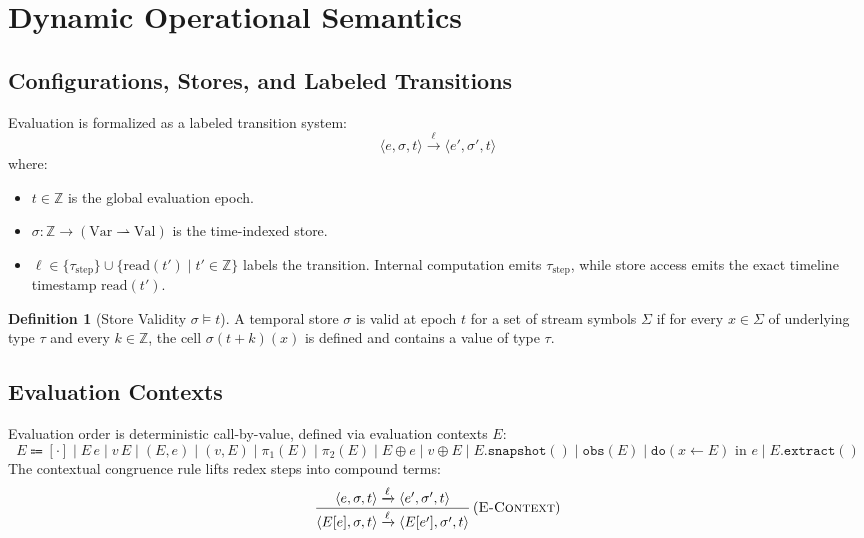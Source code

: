 \documentclass[11pt,a4paper]{article}
\theoremstyle{definition}
\newtheorem{definition}{Definition}[section]
\theoremstyle{plain}
\newcommand{\ty}[1]{\texttt{#1}}
\newcommand{\step}[1]{\xrightarrow{#1}}
\begin{document}
\section{Dynamic Operational Semantics}

\subsection{Configurations, Stores, and Labeled Transitions}

Evaluation is formalized as a labeled transition system:
\[
\langle e, \sigma, t \rangle \step{\ell} \langle e', \sigma', t \rangle
\]
where:
\begin{itemize}[itemsep=1pt]
  \item $t \in \mathbb{Z}$ is the global evaluation epoch.
  \item $\sigma : \mathbb{Z} \to (\text{Var} \rightharpoonup \text{Val})$ is the time-indexed store.
  \item $\ell \in \{\tau_{\text{step}}\} \cup \{\text{read}(t') \mid t' \in \mathbb{Z}\}$ labels the transition. Internal computation emits $\tau_{\text{step}}$, while store access emits the exact timeline timestamp $\text{read}(t')$.
\end{itemize}

\begin{definition}[Store Validity $\sigma \models t$]
A temporal store $\sigma$ is valid at epoch $t$ for a set of stream symbols $\Sigma$ if for every $x \in \Sigma$ of underlying type $\tau$ and every $k \in \mathbb{Z}$, the cell $\sigma(t+k)(x)$ is defined and contains a value of type $\tau$.
\end{definition}

\subsection{Evaluation Contexts}

Evaluation order is deterministic call-by-value, defined via evaluation contexts $E$:
\[
E \Coloneqq [\cdot] \mid E\, e \mid v\, E \mid (E, e) \mid (v, E) \mid \pi_1(E) \mid \pi_2(E) \mid E \oplus e \mid v \oplus E \mid E.\ty{snapshot}() \mid \ty{obs}(E) \mid \ty{do}(x \gets E) \text{ in } e \mid E.\ty{extract}()
\]
The contextual congruence rule lifts redex steps into compound terms:
\begin{equation}
\frac{\langle e, \sigma, t \rangle \step{\ell} \langle e', \sigma', t \rangle}{\langle E[e], \sigma, t \rangle \step{\ell} \langle E[e'], \sigma', t \rangle} \, (\textsc{E-Context})
\end{equation}
\end{document}
